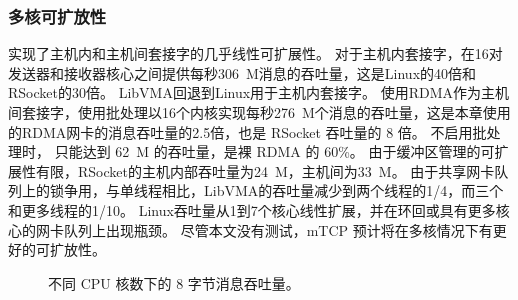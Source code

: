\subsubsection{多核可扩放性}






\sys 实现了主机内和主机间套接字的几乎线性可扩展性。
对于主机内套接字，\sys 在16对发送器和接收器核心之间提供每秒306~M消息的吞吐量，这是Linux的40倍和RSocket的30倍。
LibVMA回退到Linux用于主机内套接字。
使用RDMA作为主机间套接字，\sys 使用批处理以16个内核实现每秒276~M个消息的吞吐量，这是本章使用的RDMA网卡的消息吞吐量的2.5倍，也是 RSocket 吞吐量的 8 倍。
不启用批处理时，\sys{} 只能达到 62~M 的吞吐量，是裸 RDMA 的 60\%。
由于缓冲区管理的可扩展性有限，RSocket的主机内部吞吐量为24~M，主机间为33~M。
由于共享网卡队列上的锁争用，与单线程相比，LibVMA的吞吐量减少到两个线程的1/4，而三个和更多线程的1/10。
Linux吞吐量从1到7个核心线性扩展，并在环回或具有更多核心的网卡队列上出现瓶颈。
尽管本文没有测试，mTCP 预计将在多核情况下有更好的可扩放性。

\begin{figure}[htbp]
	
	\caption{不同 CPU 核数下的 8 字节消息吞吐量。}
	\label{socksdirect:fig:eval-corenum-tput}
\end{figure}


